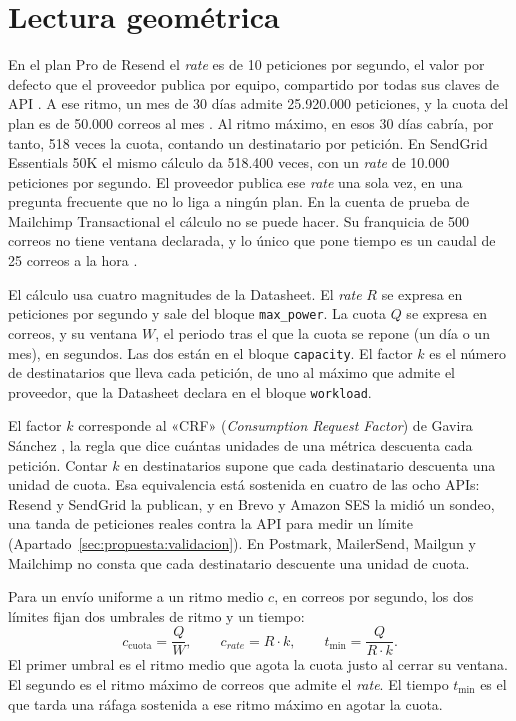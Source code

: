 \section{Lectura geométrica}
\label{sec:limites:geometrica}
\label{sec:hallazgos:limites-rates}

En el plan Pro de Resend el \textit{rate} es de 10 peticiones por segundo, el valor por defecto que el proveedor publica por equipo, compartido por todas sus claves de API \citep{resenddocs}.
A ese ritmo, un mes de 30 días admite 25.920.000 peticiones, y la cuota del plan es de 50.000 correos al mes \citep{resendpricing}.
Al ritmo máximo, en esos 30 días cabría, por tanto, 518 veces la cuota, contando un destinatario por petición.
En SendGrid Essentials 50K \citep{sendgridpricing} el mismo cálculo da 518.400 veces, con un \textit{rate} de 10.000 peticiones por segundo.
El proveedor publica ese \textit{rate} una sola vez, en una pregunta frecuente que no lo liga a ningún plan.
En la cuenta de prueba de Mailchimp Transactional el cálculo no se puede hacer.
Su franquicia de 500 correos no tiene ventana declarada, y lo único que pone tiempo es un caudal de 25 correos a la hora \citep{mailchimpdocs}.

El cálculo usa cuatro magnitudes de la Datasheet.
El \textit{rate} $R$ se expresa en peticiones por segundo y sale del bloque \texttt{max\_power}.
La cuota $Q$ se expresa en correos, y su ventana $W$, el periodo tras el que la cuota se repone (un día o un mes), en segundos.
Las dos están en el bloque \texttt{capacity}.
El factor $k$ es el número de destinatarios que lleva cada petición, de uno al máximo que admite el proveedor, que la Datasheet declara en el bloque \texttt{workload}.

El factor $k$ corresponde al «CRF» (\textit{Consumption Request Factor}) de Gavira Sánchez \citep{gavira2026tfm}, la regla que dice cuántas unidades de una métrica descuenta cada petición.
Contar $k$ en destinatarios supone que cada destinatario descuenta una unidad de cuota.
Esa equivalencia está sostenida en cuatro de las ocho APIs: Resend y SendGrid la publican, y en Brevo y Amazon SES la midió un sondeo, una tanda de peticiones reales contra la API para medir un límite (Apartado~\ref{sec:propuesta:validacion}).
En Postmark, MailerSend, Mailgun y Mailchimp no consta que cada destinatario descuente una unidad de cuota.

Para un envío uniforme a un ritmo medio $c$, en correos por segundo, los dos límites fijan dos umbrales de ritmo y un tiempo:
\begin{equation}
c_{\mathrm{cuota}} = \frac{Q}{W}, \qquad c_{\mathit{rate}} = R \cdot k, \qquad t_{\min} = \frac{Q}{R \cdot k}.
\label{eq:limites-rates}
\end{equation}
El primer umbral es el ritmo medio que agota la cuota justo al cerrar su ventana.
El segundo es el ritmo máximo de correos que admite el \textit{rate}.
El tiempo $t_{\min}$ es el que tarda una ráfaga sostenida a ese ritmo máximo en agotar la cuota.

